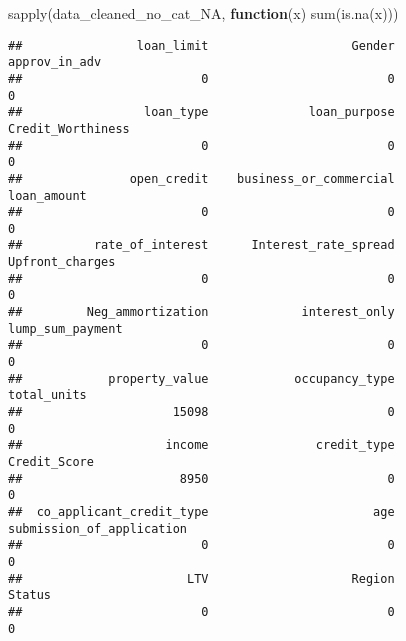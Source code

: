 \documentclass[
]{article}
\newenvironment{Shaded}{\begin{snugshade}}{\end{snugshade}}
\newcommand{\CommentTok}[1]{\textcolor[rgb]{0.56,0.35,0.01}{\textit{#1}}}
\newcommand{\ControlFlowTok}[1]{\textcolor[rgb]{0.13,0.29,0.53}{\textbf{#1}}}
\newcommand{\DecValTok}[1]{\textcolor[rgb]{0.00,0.00,0.81}{#1}}
\newcommand{\FunctionTok}[1]{\textcolor[rgb]{0.00,0.00,0.00}{#1}}
\newcommand{\NormalTok}[1]{#1}
\newcommand{\OtherTok}[1]{\textcolor[rgb]{0.56,0.35,0.01}{#1}}
\newcommand{\SpecialCharTok}[1]{\textcolor[rgb]{0.00,0.00,0.00}{#1}}
\begin{document}
\begin{Shaded}
\end{Shaded}

\begin{Shaded}
\begin{Highlighting}[]
\FunctionTok{sapply}\NormalTok{(data\_cleaned\_no\_cat\_NA, }\ControlFlowTok{function}\NormalTok{(x) }\FunctionTok{sum}\NormalTok{(}\FunctionTok{is.na}\NormalTok{(x)))}
\end{Highlighting}
\end{Shaded}

\begin{verbatim}
##                loan_limit                    Gender             approv_in_adv 
##                         0                         0                         0 
##                 loan_type              loan_purpose         Credit_Worthiness 
##                         0                         0                         0 
##               open_credit    business_or_commercial               loan_amount 
##                         0                         0                         0 
##          rate_of_interest      Interest_rate_spread           Upfront_charges 
##                         0                         0                         0 
##         Neg_ammortization             interest_only          lump_sum_payment 
##                         0                         0                         0 
##            property_value            occupancy_type               total_units 
##                     15098                         0                         0 
##                    income               credit_type              Credit_Score 
##                      8950                         0                         0 
##  co_applicant_credit_type                       age submission_of_application 
##                         0                         0                         0 
##                       LTV                    Region                    Status 
##                         0                         0                         0
\end{verbatim}
\end{document}
